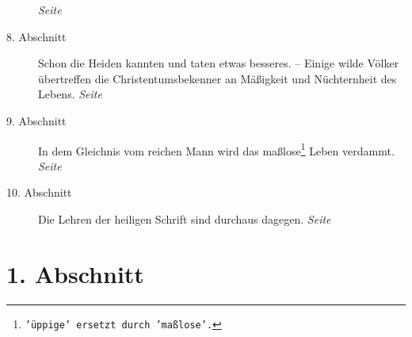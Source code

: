 \begin{description}
\dotfill \textit{Seite~\pageref{kap14_ab7}}\\
\item[8. Abschnitt] Schon die Heiden kannten und taten etwas besseres. --
Einige wilde Völker übertreffen die Christentumsbekenner an Mäßigkeit und
Nüchternheit des Lebens.
\dotfill \textit{Seite~\pageref{kap14_ab8}}\\
\item[9. Abschnitt] In dem Gleichnis vom reichen Mann wird das
maßlose\footnote{\texttt{'üppige' ersetzt durch 'maßlose'.}} Leben
verdammt.
\dotfill \textit{Seite~\pageref{kap14_ab9}}\\
\item[10. Abschnitt] Die Lehren der heiligen Schrift sind durchaus dagegen.
\dotfill \textit{Seite~\pageref{kap14_ab10}}\\
\end{description}

\newpage

\section{1. Abschnitt} \label{kap14_ab1}

